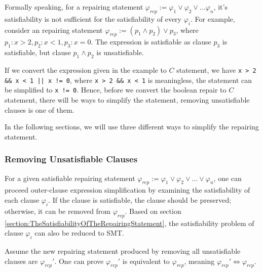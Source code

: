 \documentclass[10pt,journal,final,]{article}
\theoremstyle{definition}
\begin{document}
Formally speaking, for a repairing statement $\varphi _{rep} := \varphi _{1} \vee \varphi _{2} \vee \dots \varphi _{n}$, it's satisfiability is not sufficient for the satisfiability of every $\varphi _{i}$.
For example, consider an repairing statement $\varphi _{rep} := (p_{1} \wedge p_{2}) \vee p_{3}$, where $p_{1} : x > 2, p_{2} : x < 1, p_{3} : x = 0$. The expression is satisfiable as clause $p_{3}$ is satisfiable,
but clause $p_{1} \wedge p_{2}$ is unsatisfiable.

If we convert the expression given in the example to $C$ statement, we have \lstinline{x > 2 && x < 1 || x != 0}, where \lstinline|x > 2 && x < 1| is meaningless, the statement can be simplified to \lstinline|x != 0|.
Hence, before we convert the boolean repair to $C$ statement, there will be ways to simplify the statement, removing unsatisfiable clauses is one of them.

In the following sections, we will use three different ways to simplify the repairing statement.

\subsubsection{Removing Unsatisfiable Clauses}
For a given satisfiable repairing statement $\varphi _{rep} := \varphi _{1} \vee \varphi _{2} \vee \dots \vee \varphi _{n}$, one can proceed outer-clause expression simplification by examining the satisfiability of each clause $\varphi _{i}$.
If the clause is satisfiable, the clause should be preserved; otherwise, it can be removed from $\varphi _{rep}$.
Based on section \ref{section:TheSatisfiabilityOfTheRepairingStatement}, the satisfiability problem of clause $\varphi _{i}$ can also be reduced to SMT.

Assume the new repairing statement produced by removing all unsatisfiable clauses are $\varphi _{rep}'$.
One can prove $\varphi _{rep}'$ is equivalent to $\varphi _{rep}$, meaning $\varphi _{rep}' \Longleftrightarrow \varphi _{rep}$.
\end{document}
